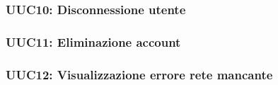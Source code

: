 \documentclass[../analisi-dei-requisiti.tex]{subfiles}
\begin{document}


\subsubsection{UUC10: Disconnessione utente}%
\label{subs:UU10}



\subsubsection{UUC11: Eliminazione account}%
\label{subs:UUC11}



\subsubsection{UUC12: Visualizzazione errore rete mancante}%
\label{subs:UUC12}


\end{document}
